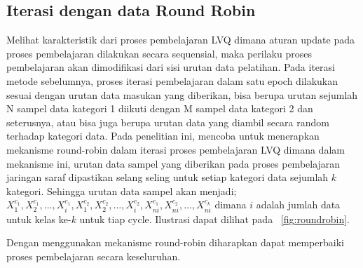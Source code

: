 \subsection{Iterasi dengan data Round Robin}
\label{ssec:round-robin}
Melihat karakteristik dari proses pembelajaran LVQ dimana aturan update pada
proses pembelajaran dilakukan secara sequensial, maka perilaku proses
pembelajaran akan dimodifikasi dari sisi urutan data pelatihan. Pada iterasi
metode sebelumnya, proses iterasi pembelajaran dalam satu epoch dilakukan sesuai  dengan urutan
data masukan yang diberikan, bisa berupa urutan sejumlah N sampel data kategori
1 diikuti dengan  M sampel data kategori 2 dan seterusnya, atau bisa juga berupa
urutan data yang diambil secara random terhadap kategori data. Pada penelitian ini, \saya
mencoba untuk menerapkan mekanisme round-robin dalam iterasi proses pembelajaran
LVQ dimana dalam mekanisme ini, urutan data sampel yang diberikan pada proses
pembelajaran jaringan saraf dipastikan selang seling untuk setiap kategori data
sejumlah $k$ kategori. Sehingga urutan data sampel akan menjadi; $X_{1}^{c_1},
X_{2}^{c_1}, \dots, X_{i}^{c_1}, X_{1}^{c_2}, X_{2}^{c_2}, \dots, X_{i}^{c_2},
X_{ni}^{c_1},X_{ni}^{c_2}, \dots,X_{ni}^{c_k}$ dimana $i$ adalah jumlah data
untuk kelas ke-$k$ untuk tiap cycle. Ilustrasi dapat dilihat pada
\pic~\ref{fig:roundrobin}.


Dengan menggunakan mekanisme round-robin diharapkan dapat memperbaiki proses
pembelajaran secara keseluruhan.

% 

